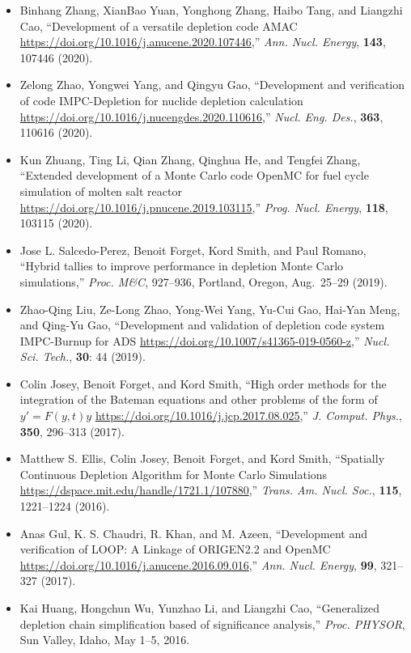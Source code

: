 \begin{itemize}

\item Binhang Zhang, XianBao Yuan, Yonghong Zhang, Haibo Tang, and Liangzhi Cao,
``Development of a versatile depletion code AMAC
\url{https://doi.org/10.1016/j.anucene.2020.107446},'' \textit{Ann. Nucl. Energy},
\textbf{143}, 107446 (2020).

\item Zelong Zhao, Yongwei Yang, and Qingyu Gao, ``Development and verification of
code IMPC-Depletion for nuclide depletion calculation
\url{https://doi.org/10.1016/j.nucengdes.2020.110616},'' \textit{Nucl. Eng. Des.},
\textbf{363}, 110616 (2020).

\item Kun Zhuang, Ting Li, Qian Zhang, Qinghua He, and Tengfei Zhang, ``Extended
development of a Monte Carlo code OpenMC for fuel cycle simulation of molten
salt reactor \url{https://doi.org/10.1016/j.pnucene.2019.103115},'' \textit{Prog. Nucl.
Energy}, \textbf{118}, 103115 (2020).

\item Jose L. Salcedo-Perez, Benoit Forget, Kord Smith, and Paul Romano, ``Hybrid
tallies to improve performance in depletion Monte Carlo simulations,'' \textit{Proc.
M\&C}, 927--936, Portland, Oregon, Aug.\ 25--29 (2019).

\item Zhao-Qing Liu, Ze-Long Zhao, Yong-Wei Yang, Yu-Cui Gao, Hai-Yan Meng, and
Qing-Yu Gao, ``Development and validation of depletion code system IMPC-Burnup
for ADS \url{https://doi.org/10.1007/s41365-019-0560-z},'' \textit{Nucl. Sci. Tech.},
\textbf{30}: 44 (2019).

\item Colin Josey, Benoit Forget, and Kord Smith, ``High order methods for the
integration of the Bateman equations and other problems of the form of $y' =
F(y,t)y$ \url{https://doi.org/10.1016/j.jcp.2017.08.025},'' \textit{J. Comput. Phys.},
\textbf{350}, 296--313 (2017).

\item Matthew S. Ellis, Colin Josey, Benoit Forget, and Kord Smith, ``Spatially
Continuous Depletion Algorithm for Monte Carlo Simulations
\url{https://dspace.mit.edu/handle/1721.1/107880},'' \textit{Trans. Am. Nucl. Soc.},
\textbf{115}, 1221--1224 (2016).

\item Anas Gul, K. S. Chaudri, R. Khan, and M. Azeen, ``Development and verification
of LOOP: A Linkage of ORIGEN2.2 and OpenMC
\url{https://doi.org/10.1016/j.anucene.2016.09.016},'' \textit{Ann. Nucl. Energy},
\textbf{99}, 321--327 (2017).

\item Kai Huang, Hongchun Wu, Yunzhao Li, and Liangzhi Cao, ``Generalized depletion
chain simplification based of significance analysis,'' \textit{Proc. PHYSOR}, Sun
Valley, Idaho, May 1--5, 2016.

\end{itemize}

